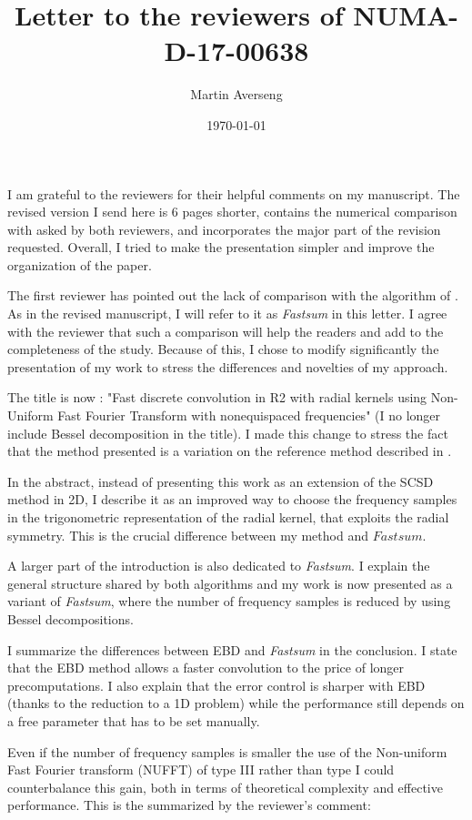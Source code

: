 \documentclass[10pt]{article}
\title{Letter to the reviewers of
		NUMA-D-17-00638 \\}
\author{Martin Averseng}
\date{\today}
\begin{document}
	
	I am grateful to the reviewers for their helpful comments on my manuscript. The revised version I send here is 6 pages shorter, contains the numerical comparison with \cite{potts2004fast} asked by both reviewers, and incorporates the major part of the revision requested. Overall, I tried to make the presentation simpler and improve the organization of the paper. 
	
	
	The first reviewer has pointed out the lack of comparison with the algorithm of \cite{potts2004fast}. As in the revised manuscript, I will refer to it as \textit{Fastsum} in this letter. I agree with the reviewer that such a comparison will help the readers and add to the completeness of the study. Because of this, I chose to modify significantly the presentation of my work to stress the differences and novelties of my approach. 
	
	The title is now : "Fast discrete convolution in R2 with radial kernels using Non-Uniform Fast Fourier Transform with nonequispaced frequencies" (I no longer include Bessel decomposition in the title). I made this change to stress the fact that the method presented is a variation on the reference method described in \cite{potts2004fast}. 
	
	In the abstract, instead of presenting this work as an extension of the SCSD method \cite{alouges2015sparse} in 2D, I describe it as an improved way to choose the frequency samples in the trigonometric representation of the radial kernel, that exploits the radial symmetry. This is the crucial difference between my method and $\textit{Fastsum}$. 
	
	A larger part of the introduction is also dedicated to \textit{Fastsum}. I explain the general structure shared by both algorithms and my work is now presented as a variant of \textit{Fastsum}, where the number of frequency samples is reduced by using Bessel decompositions. 
	
	I summarize the differences between EBD and \textit{Fastsum} in the conclusion. I state that the EBD method allows a faster convolution to the price of longer precomputations. I also explain that the error control is sharper with EBD (thanks to the reduction to a 1D problem) while the performance still depends on a free parameter that has to be set manually. 
	
	Even if the number of frequency samples is smaller the use of the Non-uniform Fast Fourier transform (NUFFT) of type III rather than type I could counterbalance this gain, both in terms of theoretical complexity and effective performance. This is the summarized by the reviewer's comment:
	
\end{document}
